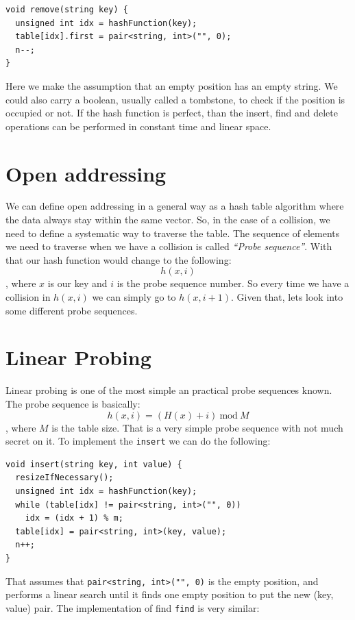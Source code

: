 \begin{lstlisting}
void remove(string key) {
  unsigned int idx = hashFunction(key);
  table[idx].first = pair<string, int>("", 0);
  n--;
}
\end{lstlisting}

Here we make the assumption that an empty position has an empty string. We could also carry a boolean, usually called a tombstone, to check if the position is occupied or not. If the hash function is perfect, than the insert, find and delete operations can be performed in constant time and linear space.

\section{Open addressing}

We can define open addressing in a general way as a hash table algorithm where the data always stay within the same vector. So, in the case of a collision, we need to define a systematic way to traverse the table. The sequence of elements we need to traverse when we have a collision is called \textit{``Probe sequence''}. With that our hash function would change to the following:
\[ h(x, i) \],
where \( x \) is our key and \( i \) is the probe sequence number. So every time we have a collision in \( h(x, i) \) we can simply go to \( h(x, i + 1) \). Given that, lets look into some different probe sequences.

\section{Linear Probing}

Linear probing is one of the most simple an practical probe sequences known. The probe sequence is basically:
\[ h(x, i) = (H(x) + i) ~\mathrm{mod}~ M \],
where \( M \) is the table size. That is a very simple probe sequence with not much secret on it. To implement the \texttt{insert} we can do the following:

\begin{lstlisting}
void insert(string key, int value) {
  resizeIfNecessary();
  unsigned int idx = hashFunction(key);
  while (table[idx] != pair<string, int>("", 0))
    idx = (idx + 1) % m;      
  table[idx] = pair<string, int>(key, value);
  n++;
}
\end{lstlisting}

That assumes that \texttt{pair<string, int>("", 0)} is the empty position, and performs a linear search until it finds one empty position to put the new (key, value) pair. The implementation of find \texttt{find} is very similar:

